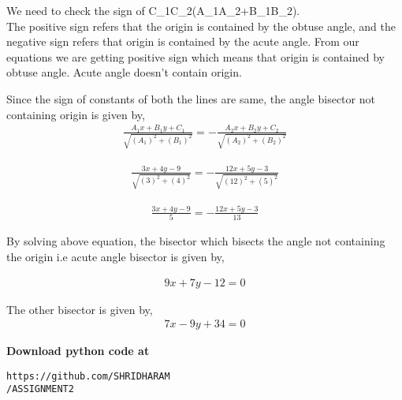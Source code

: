 \documentclass[journal,12pt,twocolumn]{IEEEtran}
\begin{document}
We need to check the sign of {C_1C_2(A_1A_2+B_1B_2).} \\

The positive sign refers that the origin is contained by the obtuse angle, and the negative sign refers that origin is contained by the acute angle. 
From our equations we are getting positive sign which means that origin is contained by obtuse angle. Acute angle doesn't contain origin.  

Since the sign of constants of both the lines are same, the angle bisector not containing origin is given by,
\begin{align}
\frac{A_1x + B_1y + C_1}{\sqrt{(A_1)^2 + (B_1)^2}} = - \frac{A_2x + B_2y + C_2}{\sqrt{(A_2)^2 + (B_2)^2}}
\end{align}

\begin{align}
\frac{3x + 4y - 9}{\sqrt{(3)^2 + (4)^2}} = - \frac{12x + 5y - 3}{\sqrt{(12)^2 + (5)^2}}
\end{align}

\begin{align}
\frac{3x + 4y - 9}{5} = - \frac{12x + 5y - 3}{13}
\end{align}

By solving above equation, the bisector which bisects the angle not containing the origin i.e acute angle bisector is given by,

\begin{align}
9x + 7y - 12 = 0 
\end{align}


The other bisector is given by,
\begin{align}
7x - 9y + 34 = 0
\end{align}



\textbf{Download python code at }
\begin{lstlisting}[frame=single] 
https://github.com/SHRIDHARAM
/ASSIGNMENT2
\end{lstlisting}
\end{document}
